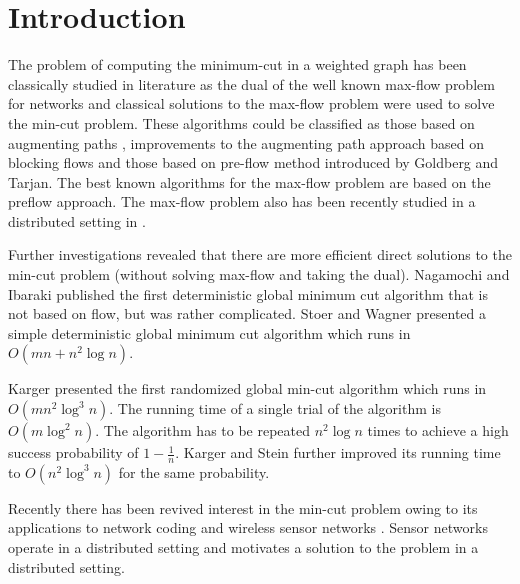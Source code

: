 \documentclass{acm_proc_article-sp}
\begin{document}


\section{Introduction}
The problem of computing the minimum-cut in a weighted graph has been
classically studied in literature
as the dual of the well known max-flow problem for networks
\cite{NRMF97} and classical solutions to the max-flow problem were used to solve the
min-cut problem. These algorithms could be classified as those based on augmenting paths
\cite{NRMF97, NRMG97}, improvements to the augmenting path
approach based on blocking flows\cite{NRMH97, NRMI97} and those based on
pre-flow method introduced by Goldberg and Tarjan\cite{NRMJ97}.  The best known algorithms for the max-flow
problem are based on the preflow approach\cite{NRMP97, NRMQ97, NRMR97}.  The max-flow
problem also has been recently studied in a distributed setting in \cite{BCDK94}.


Further investigations revealed that there are more efficient direct
solutions to the min-cut problem (without solving max-flow and taking the dual).
Nagamochi and Ibaraki\cite{NRMK97} published the first deterministic
global minimum cut algorithm that is not based on flow, but was rather
complicated. Stoer and Wagner\cite{NRML97} presented a simple
deterministic global minimum cut algorithm which runs in $O(mn + n^{2}\log{n})$.


Karger\cite{NRMM97} presented the first randomized global min-cut
algorithm which runs in $O(mn^{2}\log^{3}n)$. The running time of a
single trial of the algorithm is $O(m\log^{2}{n})$. The algorithm has to
be repeated $n^{2}\log{n}$ times to achieve a high success probability
of $1-\frac{1}{n}$. Karger and Stein\cite{NRMN97} further improved its
running time to $O(n^{2}\log^{3}n)$ for the same probability.


Recently there has been revived interest in the min-cut problem
owing to its applications to network coding and wireless sensor networks
\cite{NRMS97, NRMT97, NRMU97}. Sensor networks operate in a
distributed setting and motivates a solution to the problem in a
distributed setting.
\end{document}
